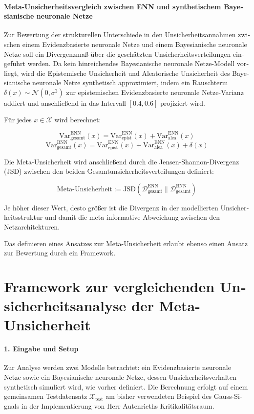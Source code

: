 \begin{otherlanguage}{ngerman}
{\paragraph{Meta-Unsicherheitsvergleich zwischen ENN und synthetischem \gls{Bayesianische neuronale Netze}} Zur Bewertung der strukturellen Unterschiede in den Unsicherheitsannahmen zwischen einem \gls{Evidenzbasierte neuronale Netze} und einem \gls{Bayesianische neuronale Netze} soll ein Divergenzmaß über die geschätzten Unsicherheitsverteilungen eingeführt werden. Da kein hinreichendes \gls{Bayesianische neuronale Netze}-Modell vorliegt, wird die \gls{Epistemische Unsicherheit} und \gls{Aleatorische Unsicherheit} des \gls{Bayesianische neuronale Netze} synthetisch approximiert, indem ein Rauschterm \( \delta(x) \sim \mathcal{N}(0, \sigma^2) \) zur epistemischen \gls{Evidenzbasierte neuronale Netze}-Varianz addiert und anschließend in das Intervall \([0.4, 0.6]\) projiziert wird.

Für jedes \( x \in \mathcal{X} \) wird berechnet:

\[
\text{Var}_{\text{gesamt}}^{\text{ENN}}(x) = \text{Var}_{\text{epist}}^{\text{ENN}}(x) + \text{Var}_{\text{alea}}^{\text{ENN}}(x)
\]
\[
\text{Var}_{\text{gesamt}}^{\text{BNN}}(x) = \text{Var}_{\text{epist}}^{\text{ENN}}(x) + \text{Var}_{\text{alea}}^{\text{ENN}}(x) + \delta(x) 
\]

Die Meta-Unsicherheit wird anschließend durch die Jensen-Shannon-Divergenz (JSD) zwischen den beiden Gesamtunsicherheitsverteilungen definiert:

\[
\text{Meta-Unsicherheit} := \text{JSD}\left( \mathcal{D}_{\text{gesamt}}^{\text{ENN}} \parallel \mathcal{D}_{\text{gesamt}}^{\text{BNN}} \right)
\]

Je höher dieser Wert, desto größer ist die Divergenz in der modellierten Unsicherheitsstruktur und damit die meta-informative Abweichung zwischen den Netzarchitekturen. 

Das definieren eines Ansatzes zur Meta-Unsicherheit erlaubt ebenso einen Ansatz zur Bewertung durch ein Framework. 

\section*{Framework zur vergleichenden Unsicherheitsanalyse der Meta-Unsicherheit}

\paragraph{1. Eingabe und Setup} Zur Analyse werden zwei Modelle betrachtet: ein \gls{Evidenzbasierte neuronale Netze} sowie ein \gls{Bayesianische neuronale Netze}, dessen Unsicherheitsverhalten synthetisch simuliert wird, wie vorher definiert. Die Berechnung erfolgt auf einem gemeinsamen Testdatensatz \( \mathcal{X}_{\text{test}} \) am bisher verwendeten Beispiel des Gauss-Signals in der Implementierung von Herr Autenrieths Kritikalitätsraum.

}
\end{otherlanguage}
